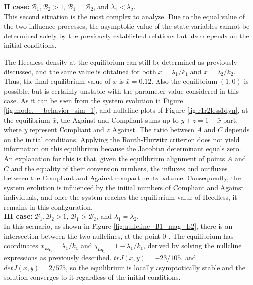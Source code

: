 \noindent\textbf{II case: } $\mathcal{B}_1, \mathcal{B}_2 >1$, $\mathcal{B}_1 =  \mathcal{B}_2$, and $\lambda_1 < \lambda_2$.\\
This second situation is the most complex to analyze. Due to the equal value of the two influence processes, the asymptotic value of the state variables cannot be determined solely by the previously established relations but also depends on the initial conditions.

The Heedless density at the equilibrium can still be determined as previously discussed, and the same value is obtained for both $x = \lambda_1/k_1$ and $x = \lambda_2/k_2$. Thus, the final equilibrium value of $x$ is $\bar{x} = 0.12$.
Also the equilibrium $(1,0)$ is possible, but is certainly unstable with the parameter value considered in this case. As it can be seen from the system evolution in Figure \ref{fig:model__behavior_sim_1}, and nullcline plots of Figure \ref{fig:r1r2less1dyn}, at the equilibrium $\bar{x}$, the Against and Compliant  sums up to $ y + z = 1 - \bar{x}$ part, where $y$ represent Compliant and $z$ Against. The ratio between $A$ and $C$ depends on the initial conditions.
Applying the Routh-Hurwitz criterion does not yield information on this equilibrium because the Jacobian determinant equals zero. An explanation for this is that, given the equilibrium alignment of points $A$ and $C$ and the equality of their conversion numbers, the influxes and outfluxes between the Compliant and Against compartments balance. Consequently, the system evolution is influenced by the initial numbers of Compliant and Against individuals, and once the system reaches the equilibrium value of Heedless, it remains in this configuration. \\


\noindent\textbf{III case:} $\mathcal{B}_1, \mathcal{B}_2 >1$, $\mathcal{B}_1 >  \mathcal{B}_2$, and $\lambda_1 = \lambda_2$. \\
In this scenario, as shown in Figure \ref{fig:nullcline_B1_mag_B2}, there is an intersection between the two nullclines, at the point 0 . The equilibrium has coordinates $x_{Eq_1} = \lambda_1/k_1$ and $y_{Eq_1} = 1 - \lambda_1/k_1 $, derived by solving the nullcline expressions as previously described. $trJ(\bar{x},\bar{y}) = -23/105$, and $detJ(\bar{x},\bar{y}) = 2/525$, so the equilibrium is locally asymptotically stable and the solution converges to it regardless of the initial conditions.\\

